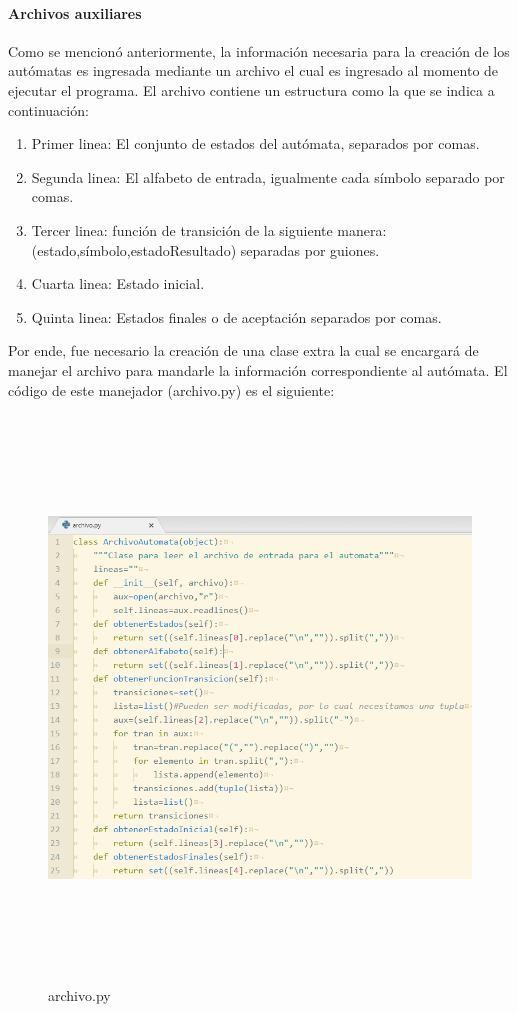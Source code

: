 	\paragraph{Archivos auxiliares}
	Como se mencionó anteriormente, la información necesaria para la creación de los autómatas es ingresada mediante un archivo el cual es ingresado al momento de ejecutar el programa. El archivo contiene un estructura como la que se indica a continuación:
	\begin{enumerate}
		\item Primer linea: El conjunto de estados del autómata, separados por comas.
		\item Segunda linea: El alfabeto de entrada, igualmente cada símbolo separado por comas.
		\item Tercer linea: función de transición de la siguiente manera: (estado,símbolo,estadoResultado) separadas por guiones.
		\item Cuarta linea: Estado inicial.
		\item Quinta linea: Estados finales o de aceptación separados por comas.
	\end{enumerate}
	Por ende, fue necesario la creación de una clase extra la cual se encargará de manejar el archivo para mandarle la información correspondiente al autómata. El código de este manejador (archivo.py) es el siguiente:
	\begin{figure}[H]
		\begin{center}
			\includegraphics[width=15cm, height=15cm]{img/archivo.png}
			\caption{archivo.py}
			\label{fig:tablas7}
		\end{center}
	\end{figure}
